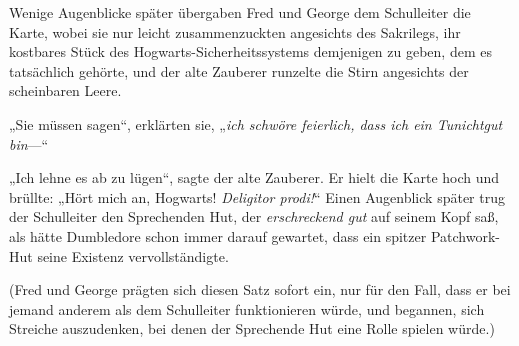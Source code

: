 Wenige Augenblicke später übergaben Fred und George dem Schulleiter die Karte, wobei sie nur leicht zusammenzuckten angesichts des Sakrilegs, ihr kostbares Stück des Hogwarts-Sicherheitssystems demjenigen zu geben, dem es tatsächlich gehörte, und der alte Zauberer runzelte die Stirn angesichts der scheinbaren Leere.

„Sie müssen sagen“, erklärten sie, „\emph{ich schwöre feierlich, dass ich ein Tunichtgut bin}—“

„Ich lehne es ab zu lügen“, sagte der alte Zauberer. Er hielt die Karte hoch und brüllte: „Hört mich an, Hogwarts! \emph{Deligitor prodi!}“
Einen Augenblick später trug der Schulleiter den Sprechenden Hut, der \emph{erschreckend gut} auf seinem Kopf saß, als hätte Dumbledore schon immer darauf gewartet, dass ein spitzer Patchwork-Hut seine Existenz vervollständigte.

(Fred und George prägten sich diesen Satz sofort ein, nur für den Fall, dass er bei jemand anderem als dem Schulleiter funktionieren würde, und begannen, sich Streiche auszudenken, bei denen der Sprechende Hut eine Rolle spielen würde.)

